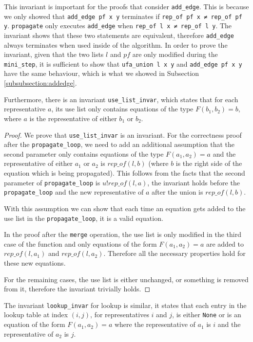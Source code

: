 This invariant is important for the proofs that consider \lstinline{add_edge}. This is because we only showed that \lstinline{add_edge pf x y} terminates if \lstinline{rep_of pf x ≠ rep_of pf y}. \lstinline{propagate} only executes \lstinline{add_edge} when \lstinline{rep_of l x ≠ rep_of l y}. The invariant shows that these two statements are equivalent, therefore \lstinline{add_edge} always terminates when used inside of the algorithm.
In order to prove the invariant, given that the two lists $l$ and $pf$ are only modified during the \lstinline{mini_step}, it is sufficient to show that \lstinline{ufa_union l x y} and \lstinline{add_edge pf x y} have the same behaviour, which is what we showed in Subsection \ref{subsubsection:addedge}.

Furthermore, there is an invariant \lstinline|use_list_invar|, which states that for each representative $a$, its use list only contains equations of the type $F(b_1, b_2) = b$, where $a$ is the representative of either $b_1$ or $b_2$.

\begin{proof}
We prove that \lstinline|use_list_invar| is an invariant.
For the correctness proof after the \lstinline{propagate_loop}, we need to add an additional assumption that the second parameter only contains equations of the type $F(a_1, a_2) = a$ and the representative of either $a_1$ or $a_2$ is $rep\_of(l, b)$ (where $b$ is the right side of the equation which is being propagated). This follows from the facts that the second parameter of \lstinline{propagate_loop} is $u ! rep\_of(l, a)$, the invariant holds before the \lstinline{propagate_loop} and the new representative of $a$ after the union is $rep\_of(l, b)$.

With this assumption we can show that each time an equation gets added to the use list in the \lstinline{propagate_loop}, it is a valid equation.

In the proof after the \lstinline{merge} operation, the use list is only modified in the third case of the function and only equations of the form $F(a_1, a_2) = a$ are added to $rep\_of(l, a_1)$  and $rep\_of(l, a_2)$. Therefore all the necessary properties hold for these new equations.

For the remaining cases, the use list is either unchanged, or something is removed from it, therefore the invariant trivially holds.
\end{proof}

The invariant \lstinline|lookup_invar| for lookup is similar, it states that each entry in the lookup table at index $(i, j)$, for representatives $i$ and $j$, is either \lstinline{None} or is an equation of the form $F(a_1, a_2) = a$ where the representative of $a_1$ is $i$ and the representative of $a_2$ is $j$.

